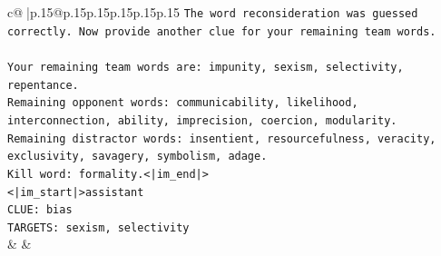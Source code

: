 \documentclass{article}
\begin{document}
{\begin{supertabular}{c@{$\;$}|p{.15\linewidth}@{}p{.15\linewidth}p{.15\linewidth}p{.15\linewidth}p{.15\linewidth}p{.15\linewidth}}
{{{\texttt{The word reconsideration was guessed correctly. Now provide another clue for your remaining team words.} \\
\\ 
\texttt{Your remaining team words are: impunity, sexism, selectivity, repentance.} \\
\texttt{Remaining opponent words: communicability, likelihood, interconnection, ability, imprecision, coercion, modularity.} \\
\texttt{Remaining distractor words: insentient, resourcefulness, veracity, exclusivity, savagery, symbolism, adage.} \\
\texttt{Kill word: formality.<|im\_end|>} \\
\texttt{<|im\_start|>assistant} \\
\texttt{CLUE: bias} \\
\texttt{TARGETS: sexism, selectivity} \\
            }
        }
    }
    & & \\ \\


\end{supertabular}}
\end{document}
